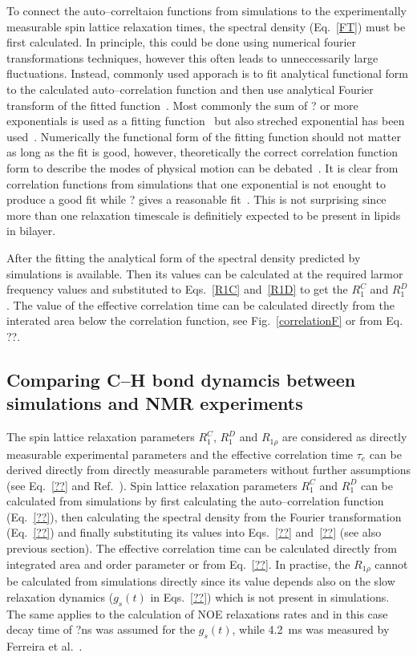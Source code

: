 \documentclass[aps,prl,superscriptaddress,twocolumn]{revtex4}
\begin{document}
To connect the auto--correltaion functions from simulations to the experimentally measurable spin lattice relaxation times, the spectral density (Eq.~\ref{FT})
must be first calculated. In principle, this could be done using numerical fourier transformations techniques, 
however this often leads to unneccessarily large fluctuations. Instead, commonly used apporach is to fit 
analytical functional form to the calculated auto--correlation function and then use analytical Fourier
transform of the fitted function~\cite{??}. Most commonly the sum of ? or more exponentials is used as a fitting function~\cite{??} but
also streched exponential has been used~\cite{??}. Numerically the functional form of the fitting function should not matter as
long as the fit is good, however, theoretically the correct correlation function form to describe the modes of
physical motion can be debated~\cite{??}. It is clear from correlation functions from simulations that one exponential 
is not enought to produce a good fit while ? gives a reasonable fit~\cite{??}. This is not surprising since more
than one relaxation timescale is definitiely expected to be present in lipids in bilayer.

After the fitting the analytical form of the spectral density predicted by simulations is available.
Then its values can be calculated at the required larmor frequency values and substituted to Eqs.~\ref{R1C}
and~\ref{R1D} to get the $R_{1}^{C}$ and $R_{1}^{D}$. The value of the effective correlation time can be
calculated directly from the interated area below the correlation function, see Fig.~\ref{correlationF} or from 
Eq. ??.




\subsection{Comparing C--H bond dynamcis between simulations and NMR experiments}

The spin lattice relaxation parameters $R_1^{C}$, $R_1^{D}$ and $R_{1\rho}$ are considered as
directly measurable experimental parameters and the effective correlation time $\tau_e$ can be derived directly
from directly measurable parameters without further assumptions (see Eq.~\ref{??} and Ref.~\cite{ferreira15}).
Spin lattice relaxation parameters $R_1^{C}$ and $R_1^{D}$ can be calculated from simulations
by first calculating the auto--correlation function (Eq.~\ref{??}), then calculating the spectral
density from the Fourier transformation (Eq.~\ref{??}) and finally substituting its values into
Eqs.~\ref{??} and~\ref{??} (see also previous section). The effective correlation time can be calculated
directly from integrated area and order parameter or from Eq.~\ref{??}.
In practise, the $R_{1\rho}$ cannot be calculated from simulations directly since its value depends
also on the slow relaxation dynamics ($g_s(t)$ in Eqs.~\ref{??}) which is not present in simulations.
The same applies to the calculation of NOE relaxations rates and in this case decay time of ?ns was assumed for the
$g_s(t)$, while 4.2~ms was measured by Ferreira et al.~\cite{ferrereira15}.
\end{document}
